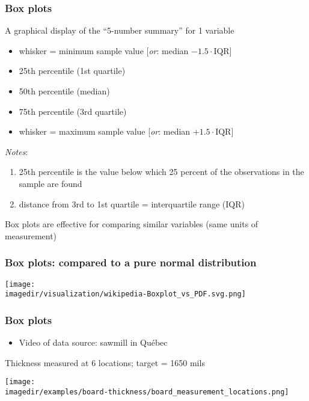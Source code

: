 \begin{frame}\frametitle{Box plots}
	
	A graphical display of the ``5-number summary'' for 1 variable 
	\begin{itemize}
		\item	whisker = minimum sample value [\emph{or}: median $- 1.5\cdot\text{IQR}$]
		\item	25th percentile (1st quartile) 
		\item	50th percentile (median) 
		\item	75th percentile (3rd quartile) 
		\item	whisker = maximum sample value [\emph{or}: median $+ 1.5\cdot\text{IQR}$]
	\end{itemize}
	
	\emph{Notes}: 
	\begin{enumerate}
		\item	25th percentile is the value below which 25 percent of the observations in the sample are found 
		\item	distance from 3rd to 1st quartile = interquartile range (IQR) 
	\end{enumerate}
	
	Box plots are effective for comparing similar variables (same units of measurement)
\end{frame}

\begin{frame}\frametitle{Box plots: compared to a pure normal distribution}
	\begin{center}
		\texttt{[image: \\imagedir/visualization/wikipedia-Boxplot\_vs\_PDF.svg.png]}
	\end{center}
	\vspace{-16pt}
\end{frame}

\begin{frame}\frametitle{Box plots}
	\begin{itemize}
		\item	Video of data source: sawmill in Québec
	\end{itemize}
	
	\vfill
	Thickness measured at 6 locations; target = 1650 mils
	\begin{center}
		\texttt{[image: \\imagedir/examples/board-thickness/board\_measurement\_locations.png]}
	\end{center}
\end{frame}

